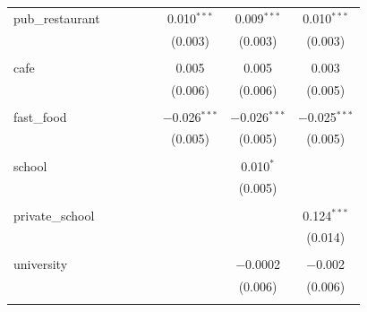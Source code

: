 \documentclass{article}
\begin{document}
\begin{table}[H]
\begin{tabular}{@{\extracolsep{-10pt}}lccccccc}
 pub\_restaurant &  &  &  &  & 0.010$^{***}$ & 0.009$^{***}$ & 0.010$^{***}$ \\ 
  &  &  &  &  & (0.003) & (0.003) & (0.003) \\ 
  & & & & & & & \\ 
 cafe &  &  &  &  & 0.005 & 0.005 & 0.003 \\ 
  &  &  &  &  & (0.006) & (0.006) & (0.005) \\ 
  & & & & & & & \\ 
 fast\_food &  &  &  &  & $-$0.026$^{***}$ & $-$0.026$^{***}$ & $-$0.025$^{***}$ \\ 
  &  &  &  &  & (0.005) & (0.005) & (0.005) \\ 
  & & & & & & & \\ 
 school &  &  &  &  &  & 0.010$^{*}$ &  \\ 
  &  &  &  &  &  & (0.005) &  \\ 
  & & & & & & & \\ 
 private\_school &  &  &  &  &  &  & 0.124$^{***}$ \\ 
  &  &  &  &  &  &  & (0.014) \\ 
  & & & & & & & \\ 
 university &  &  &  &  &  & $-$0.0002 & $-$0.002 \\ 
  &  &  &  &  &  & (0.006) & (0.006) \\ 
  & & & & & & & \\ 

\end{tabular}
\end{table}
\end{document}
